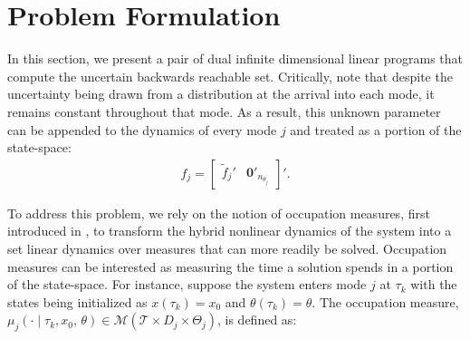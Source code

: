 \section{Problem Formulation}
\label{sec:prob}

In this section, we present a pair of dual infinite dimensional linear programs that compute the uncertain backwards reachable set.
Critically, note that despite the uncertainty being drawn from a distribution at the arrival into each mode, it remains constant throughout that mode.
As a result, this unknown parameter can be appended to the dynamics of every mode $j$ and treated as a portion of the state-space:
\begin{align}
f_j=\begin{bmatrix}
  \tilde f_j'&\mathbf{0}'_{n_{\theta_j}}
\end{bmatrix}'.
\end{align}

To address this problem, we rely on the notion of occupation measures, first introduced in \cite{Pitman1977}, to transform the hybrid nonlinear dynamics of the system into a set linear dynamics over measures that can more readily be solved.
Occupation measures can be interested as measuring the time a solution spends in a portion of the state-space.
For instance, suppose the system enters mode $j$ at $\tau_k$ with the states being initialized as $x(\tau_k)=x_0$ and $\theta(\tau_k)=\theta$.
The occupation measure, \mbox{$\mu_j(\cdot\mid \tau_k,x_0,\,\theta)\in \mathcal M(\mathcal T\times D_j\times \Theta_j)$}, is defined as:

